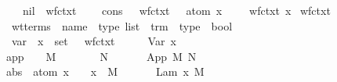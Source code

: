 \begin{isabellebody}
\isanewline
\ \ \ \ nil{\isacharcolon}\ \ {\isachardoublequoteopen}wf{\isacharunderscore}ctxt\ {\isacharbrackleft}{\isacharbrackright}{\isachardoublequoteclose}\isanewline
\ \ {\isacharbar}\ cons{\isacharcolon}\ \ {\isachardoublequoteopen}{\isasymlbrakk}\ wf{\isacharunderscore}ctxt\ {\isasymGamma}\ {\isacharsemicolon}\ atom\ x\ {\isasymsharp}\ {\isasymGamma}\ {\isasymrbrakk}\ {\isasymLongrightarrow}\ wf{\isacharunderscore}ctxt\ {\isacharparenleft}{\isacharparenleft}x{\isacharcomma}{\isasymsigma}{\isacharparenright}{\isacharhash}{\isasymGamma}{\isacharparenright}{\isachardoublequoteclose}\isanewline
{}\isamarkupfalse%
\ wf{\isacharunderscore}ctxt\isanewline
\isanewline
{}\isamarkupfalse%
\isanewline
\ \ wt{\isacharunderscore}terms\ {\isacharcolon}{\isacharcolon}\ {\isachardoublequoteopen}{\isacharparenleft}name\ {\isasymtimes}\ type{\isacharparenright}\ list\ {\isasymRightarrow}\ trm\ {\isasymRightarrow}\ type\ {\isasymRightarrow}\ bool{\isachardoublequoteclose}\ {\isacharparenleft}{\isachardoublequoteopen}{\isacharunderscore}\ {\isasymturnstile}\ {\isacharunderscore}\ {\isacharcolon}\ {\isacharunderscore}{\isachardoublequoteclose}{\isacharparenright}\isanewline
{}\isanewline
\ \ var{\isacharcolon}\ {\isachardoublequoteopen}{\isasymlbrakk}\ {\isacharparenleft}x{\isacharcomma}{\isasymsigma}{\isacharparenright}\ {\isasymin}\ set\ {\isasymGamma}\ {\isacharsemicolon}\ wf{\isacharunderscore}ctxt\ {\isasymGamma}\ {\isasymrbrakk}\ {\isasymLongrightarrow}\ {\isasymGamma}\ {\isasymturnstile}\ Var\ x\ {\isacharcolon}\ {\isasymsigma}{\isachardoublequoteclose}\isanewline
{\isacharbar}\ app{\isacharcolon}\ {\isachardoublequoteopen}{\isasymlbrakk}\ {\isasymGamma}\ {\isasymturnstile}\ M\ {\isacharcolon}\ {\isasymsigma}\ {\isasymrightarrow}\ {\isasymtau}\ {\isacharsemicolon}\ {\isasymGamma}\ {\isasymturnstile}\ N\ {\isacharcolon}\ {\isasymsigma}\ {\isasymrbrakk}\ {\isasymLongrightarrow}\ {\isasymGamma}\ {\isasymturnstile}\ App\ M\ N\ {\isacharcolon}\ {\isasymtau}{\isachardoublequoteclose}\isanewline
\isanewline
{\isacharbar}\ abs{\isacharcolon}\ {\isachardoublequoteopen}{\isasymlbrakk}\ atom\ x\ {\isasymsharp}\ {\isasymGamma}\ {\isacharsemicolon}\ {\isacharparenleft}{\isacharparenleft}x{\isacharcomma}{\isasymsigma}{\isacharparenright}{\isacharhash}{\isasymGamma}{\isacharparenright}\ {\isasymturnstile}\ M\ {\isacharcolon}\ {\isasymtau}\ {\isasymrbrakk}\ {\isasymLongrightarrow}\ {\isasymGamma}\ {\isasymturnstile}\ Lam\ {\isacharbrackleft}x{\isacharbrackright}{\isachardot}\ M\ {\isacharcolon}\ {\isasymsigma}\ {\isasymrightarrow}\ {\isasymtau}{\isachardoublequoteclose}\isanewline

\end{isabellebody}
